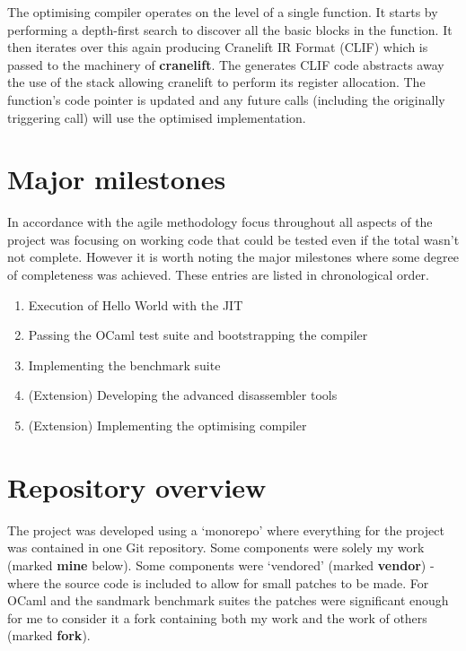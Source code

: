 The optimising compiler operates on the level of a single function. It starts by performing a
depth-first search to discover all the basic blocks in the function. It then iterates over this
again producing Cranelift IR Format (CLIF) which is passed to the machinery of
\textbf{cranelift}. The generates CLIF code abstracts away the use of the stack allowing cranelift
to perform its register allocation. The function's code pointer is updated and any future calls
(including the originally triggering call) will use the optimised implementation.

\section{Major milestones}

In accordance with the agile methodology focus throughout all aspects of the project was focusing
on
working code that could be tested even if the total wasn't not complete. However it is worth noting
the major milestones where some degree of completeness was achieved. These entries are listed in
chronological order.

\begin{enumerate}
      \item Execution of Hello World with the JIT
      \item Passing the OCaml test suite and bootstrapping the compiler
      \item Implementing the benchmark suite
      \item (Extension) Developing the advanced disassembler tools
      \item (Extension) Implementing the optimising compiler
\end{enumerate}

\section{Repository overview}

The project was developed using a `monorepo' where everything for the project was contained in one
Git repository. Some components were solely my work (marked \textbf{mine} below). Some components
were `vendored' (marked \textbf{vendor}) - where the source code is included to allow for small
patches to be made. For OCaml and the sandmark benchmark suites the patches were significant enough
for me to consider it a fork containing both my work and the work of others (marked \textbf{fork}).

